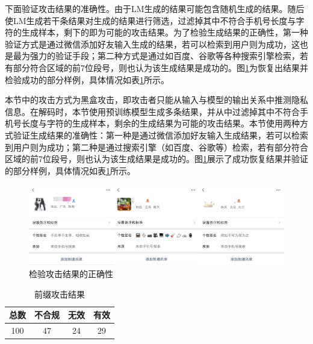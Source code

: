 下面验证攻击结果的准确性。由于LM生成的结果可能包含随机生成的结果。随后使LM生成若干条结果对生成的结果进行筛选，过滤掉其中不符合手机号长度与字符的生成样本，剩下的即为可能的攻击结果。为了检验生成结果的正确性，第一种验证方式是通过微信添加好友输入生成的结果，若可以检索到用户则为成功，这也是最为强力的验证手段；第二种方式是通过如百度、谷歌等各种搜索引擎检索，若有部分符合区域的前7位段号，则也认为该生成结果是成功的。图\ref{AttackWeChatRes}为恢复出结果并检验成功的部分样例，具体情况如表\ref{Prefix_Attack_Table}所示。

本节中的攻击方式为黑盒攻击，即攻击者只能从输入与模型的输出关系中推测隐私信息。在解码时，本节使用预训练模型生成多条结果，并从中过滤掉其中不符合手机号长度与字符的生成样本，剩余的生成结果为可能的攻击结果。本节使用两种方式验证生成结果的准确性：第一种是通过微信添加好友输入生成结果，若可以检索到用户则为成功；第二种是通过搜索引擎（如百度、谷歌等）检索，若有部分符合区域的前7位段号，则也认为该生成结果是成功的。图\ref{AttackWeChatRes}展示了成功恢复结果并验证的部分样例，具体情况如表\ref{Prefix_Attack_Table}所示。

\begin{figure}[h]
	\centering
	\includegraphics[width=\linewidth]{figures/AttackWeChatRes.png}
	\caption{检验攻击结果的正确性}
	\label{AttackWeChatRes}
\end{figure}

\begin{table}[]
	\centering
	\caption{前缀攻击结果}
	\begin{tabular}{|c|c|c|c|}
		\hline
		总数&不合规&无效&有效   \\ \hline
		100&47&24&29    \\ \hline
	\end{tabular}
	\label{Prefix_Attack_Table}
\end{table}


